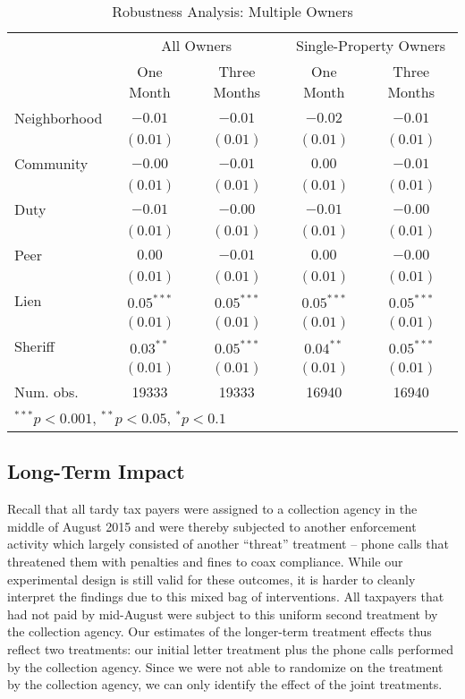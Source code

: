 \documentclass[12pt]{article}
\begin{document}
\begin{table}
\caption{Robustness Analysis: Multiple Owners}
\begin{center}
\begin{tabular}{l c c c c }
\hline
 & \multicolumn{2}{c}{All Owners} & \multicolumn{2}{c}{Single-Property Owners} \\
          & One Month & Three Months & One Month & Three Months \\
\hline
Neighborhood & $-0.01$      & $-0.01$      & $-0.02$      & $-0.01$      \\
          & $(0.01)$     & $(0.01)$     & $(0.01)$     & $(0.01)$     \\
Community     & $-0.00$      & $-0.01$      & $0.00$       & $-0.01$      \\
          & $(0.01)$     & $(0.01)$     & $(0.01)$     & $(0.01)$     \\
Duty      & $-0.01$      & $-0.00$      & $-0.01$      & $-0.00$      \\
          & $(0.01)$     & $(0.01)$     & $(0.01)$     & $(0.01)$     \\
Peer      & $0.00$       & $-0.01$      & $0.00$       & $-0.00$      \\
          & $(0.01)$     & $(0.01)$     & $(0.01)$     & $(0.01)$     \\
Lien      & $0.05^{***}$ & $0.05^{***}$ & $0.05^{***}$ & $0.05^{***}$ \\
          & $(0.01)$     & $(0.01)$     & $(0.01)$     & $(0.01)$     \\
Sheriff   & $0.03^{**}$  & $0.05^{***}$ & $0.04^{**}$  & $0.05^{***}$ \\
          & $(0.01)$     & $(0.01)$     & $(0.01)$     & $(0.01)$     \\
\hline
Num. obs. & 19333        & 19333        & 16940        & 16940        \\
\hline
\multicolumn{5}{l}{\scriptsize{$^{***}p<0.001$, $^{**}p<0.05$, $^*p<0.1$}}
\end{tabular}
\label{sh_lpm_rob}
\end{center}
\end{table}


\subsection{Long-Term Impact}

Recall that all tardy tax payers were assigned to a collection agency
in the middle of August 2015 and were thereby subjected to another
enforcement activity which largely consisted of another ``threat''
treatment -- phone calls that threatened them with penalties and fines
to coax compliance.  While our experimental design is still valid for
these outcomes, it is harder to cleanly interpret the findings due to
this mixed bag of interventions.  All taxpayers that had not paid by
mid-August were subject to this uniform second treatment by the
collection agency.  Our estimates of the longer-term treatment effects
thus reflect two treatments: our initial letter treatment plus the
phone calls performed by the collection agency. Since we were not able
to randomize on the treatment by the collection agency, we can only
identify the effect of the joint treatments.
\end{document}
